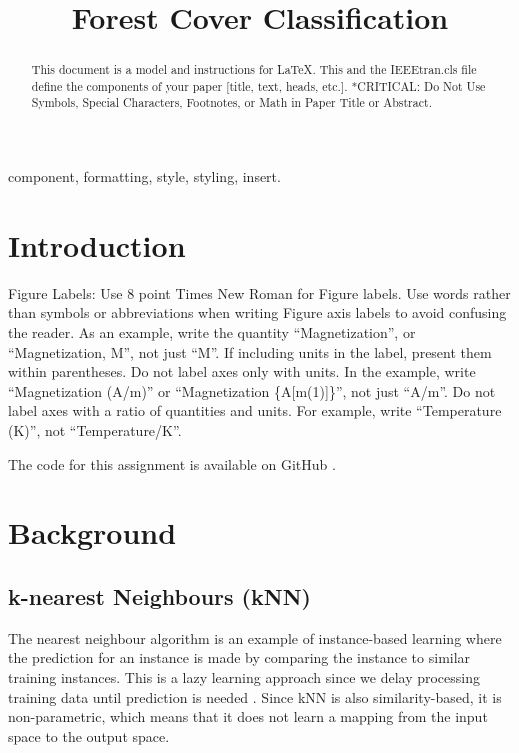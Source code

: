 \documentclass[10pt, conference]{IEEEtran}
\begin{document}
\title{Forest Cover Classification\\

}

\author{
}

\maketitle

\begin{abstract}
This document is a model and instructions for \LaTeX.
This and the IEEEtran.cls file define the components of your paper [title, text, heads, etc.]. *CRITICAL: Do Not Use Symbols, Special Characters, Footnotes, 
or Math in Paper Title or Abstract.
\end{abstract}

\begin{IEEEkeywords}
component, formatting, style, styling, insert.
\end{IEEEkeywords}

\section{Introduction}


Figure Labels: Use 8 point Times New Roman for Figure labels. Use words 
rather than symbols or abbreviations when writing Figure axis labels to 
avoid confusing the reader. As an example, write the quantity 
``Magnetization'', or ``Magnetization, M'', not just ``M''. If including 
units in the label, present them within parentheses. Do not label axes only 
with units. In the example, write ``Magnetization (A/m)'' or ``Magnetization 
\{A[m(1)]\}'', not just ``A/m''. Do not label axes with a ratio of 
quantities and units. For example, write ``Temperature (K)'', not 
``Temperature/K''.

The code for this assignment is available on GitHub \cite{Voltzz9_ml441_assign2_2025}.


\section{Background}

\subsection{k-nearest Neighbours (kNN)}
The nearest neighbour algorithm is an example of instance-based learning where the prediction for an instance is made by comparing the instance to similar training instances. This is a lazy learning approach since we delay processing training data until prediction is needed \cite{kelleher2020fundamentals}. Since kNN is also similarity-based, it is non-parametric, which means that it does not learn a mapping from the input space to the output space.
\end{document}
